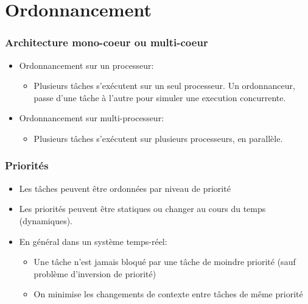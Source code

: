 \documentclass[ignorenonframetext,]{beamer}
\begin{document}
\section{Ordonnancement}

\begin{frame}\frametitle{Architecture mono-coeur ou multi-coeur}

\begin{itemize}
\item
  Ordonnancement sur un processeur:

  \begin{itemize}
  \item
    Plusieurs tâches s'exécutent sur un seul processeur. Un
    ordonnanceur, passe d'une tâche à l'autre pour simuler une execution
    concurrente.
  \end{itemize}
\item
  Ordonnancement sur multi-processeur:

  \begin{itemize}
  \item
    Plusieurs tâches s'exécutent sur plusieurs processeurs, en
    parallèle.
  \end{itemize}
\end{itemize}

\end{frame}

\begin{frame}\frametitle{Priorités}

\begin{itemize}
\item
  Les tâches peuvent être ordonnées par niveau de priorité
\item
  Les priorités peuvent être statiques ou changer au cours du temps
  (dynamiques).
\item
  En général dans un système temps-réel:

  \begin{itemize}
  \item
    Une tâche n'est jamais bloqué par une tâche de moindre priorité
    (sauf problème d'inversion de priorité)
  \item
    On minimise les changements de contexte entre tâches de même
    priorité
  \end{itemize}
\end{itemize}

\end{frame}
\end{document}
